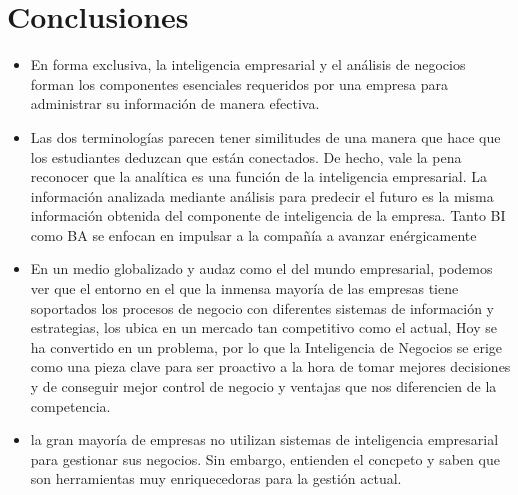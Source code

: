 \documentclass[%
 reprint,
 amsmath,amssymb,
 aps,
]{revtex4-1}
\begin{document}
\section{Conclusiones}
\begin{itemize}
\item En forma exclusiva, la inteligencia empresarial y el análisis de negocios forman los componentes esenciales requeridos por una empresa para administrar su información de manera efectiva.
\\
\item 
Las dos terminologías parecen tener similitudes de una manera que hace que los estudiantes deduzcan que están conectados. De hecho, vale la pena reconocer que la analítica es una función de la inteligencia empresarial. La información analizada mediante análisis para predecir el futuro es la misma información obtenida del componente de inteligencia de la empresa. Tanto BI como BA se enfocan en impulsar a la compañía a avanzar enérgicamente
\\
\item En un medio globalizado y audaz como el del mundo empresarial, podemos ver que el entorno en el que la inmensa mayoría de las empresas tiene soportados los procesos de negocio con diferentes sistemas de información y estrategias, los ubica en un mercado tan competitivo como el actual, Hoy se ha convertido en un problema, por lo que la Inteligencia de Negocios se erige como una pieza clave para ser proactivo a la hora de tomar mejores decisiones y de conseguir mejor control de negocio y ventajas que nos diferencien de la competencia.
\\
\item la gran mayoría de empresas no utilizan sistemas de inteligencia empresarial para gestionar sus negocios. Sin embargo, entienden el concpeto y saben que son herramientas muy enriquecedoras para la gestión actual.
\end{itemize} 






\end{document}
